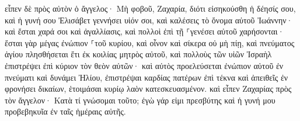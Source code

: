 \documentclass{openreader}
\begin{document}
εἶπεν δὲ πρὸς αὐτὸν ὁ ἄγγελος· Μὴ φοβοῦ, Ζαχαρία, διότι εἰσηκούσθη ἡ δέησίς σου, καὶ ἡ γυνή σου Ἐλισάβετ γεννήσει υἱόν σοι, καὶ καλέσεις τὸ ὄνομα αὐτοῦ Ἰωάννην· 
καὶ ἔσται χαρά σοι καὶ ἀγαλλίασις, καὶ πολλοὶ ἐπὶ τῇ ⸀γενέσει αὐτοῦ χαρήσονται· 
ἔσται γὰρ μέγας ἐνώπιον ⸀τοῦ κυρίου, καὶ οἶνον καὶ σίκερα οὐ μὴ πίῃ, καὶ πνεύματος ἁγίου πλησθήσεται ἔτι ἐκ κοιλίας μητρὸς αὐτοῦ, 
καὶ πολλοὺς τῶν υἱῶν Ἰσραὴλ ἐπιστρέψει ἐπὶ κύριον τὸν θεὸν αὐτῶν· 
καὶ αὐτὸς προελεύσεται ἐνώπιον αὐτοῦ ἐν πνεύματι καὶ δυνάμει Ἠλίου, ἐπιστρέψαι καρδίας πατέρων ἐπὶ τέκνα καὶ ἀπειθεῖς ἐν φρονήσει δικαίων, ἑτοιμάσαι κυρίῳ λαὸν κατεσκευασμένον. 
καὶ εἶπεν Ζαχαρίας πρὸς τὸν ἄγγελον· Κατὰ τί γνώσομαι τοῦτο; ἐγὼ γάρ εἰμι πρεσβύτης καὶ ἡ γυνή μου προβεβηκυῖα ἐν ταῖς ἡμέραις αὐτῆς. 
\end{document}
